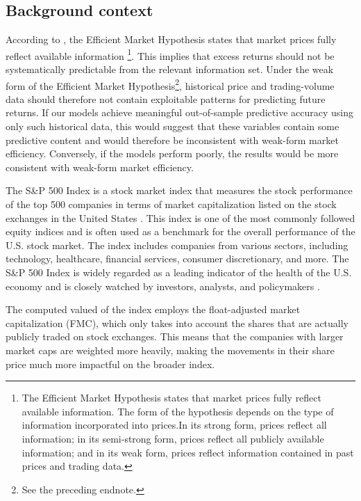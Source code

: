 \documentclass[11pt]{article}
\begin{document}
\subsection{Background context}

\quad According to \citeauthor{wolfers_2004}, the Efficient Market Hypothesis states that market prices fully reflect available information \footnote{The Efficient Market Hypothesis states that market prices fully reflect available information. The form of the hypothesis depends on the type of information incorporated into prices.In its strong form, prices reflect all information; in its semi-strong form, prices reflect all publicly available information; and in its weak form, prices reflect information contained in past prices and trading data.}. This implies that excess returns should not be systematically predictable from the relevant information set. Under the weak form of the Efficient Market Hypothesis\footnote{See the preceding endnote.}, historical price and trading-volume data should therefore not contain exploitable patterns for predicting future returns. If our models achieve meaningful out-of-sample predictive accuracy using only such historical data, this would suggest that these variables contain some predictive content and would therefore be inconsistent with weak-form market efficiency. Conversely, if the models perform poorly, the results would be more consistent with weak-form market efficiency.

The S\&P 500 Index is a stock market index that measures the stock performance of the top 500 companies in terms of market capitalization listed on the stock exchanges in the United States \cite{spglobal_2024}. This index is one of the most commonly followed equity indices and is often used as a benchmark for the overall performance of the U.S. stock market. The index includes companies from various sectors, including technology, healthcare, financial services, consumer discretionary, and more. The S\&P 500 Index is widely regarded as a leading indicator of the health of the U.S. economy and is closely watched by investors, analysts, and policymakers \cite{investopedia_2024}.

The computed valued of the index employs the float-adjusted market capitalization (FMC), which only takes into account the shares that are actually publicly traded on stock exchanges. This means that the companies with larger market caps are weighted more heavily, making the movements in their share price much more impactful on the broader index.
\end{document}
